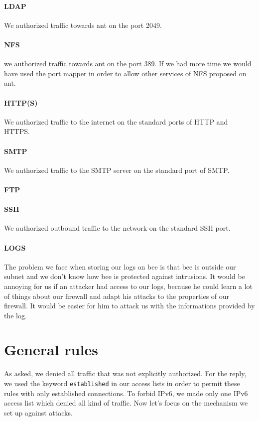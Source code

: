 \documentclass[a4paper,titlepage]{article}
\begin{document}
\paragraph{LDAP} We authorized traffic towards ant on the port 2049.
\paragraph{NFS} we authorized traffic towards ant on the port 389. If we had more time we would have used the port mapper in order to allow other services of NFS proposed on ant.
\paragraph{HTTP(S)} We authorized traffic to the internet on the standard ports of HTTP and HTTPS.
\paragraph{SMTP} We authorized traffic to the SMTP server on the standard port of SMTP.
\paragraph{FTP}
\paragraph{SSH} We authorized outbound traffic to the network on the standard SSH port.
\paragraph{LOGS} The problem we face when storing our logs on bee is that bee is outside our subnet and we don't know how bee is protected against intrusions. It would be annoying for us if an attacker had access to our logs, because he could learn a lot of things about our firewall and adapt his attacks to the properties of our firewall. It would be easier for him to attack us with the informations provided by the log.

\section{General rules}
As asked, we denied all traffic that was not explicitly authorized. For the reply, we used the keyword \texttt{established} in our access lists in order to permit these rules with only established connections. To forbid IPv6, we made only one IPv6 access list which denied all kind of traffic. Now let's focus on the mechanism we set up against attacks.
\end{document}

